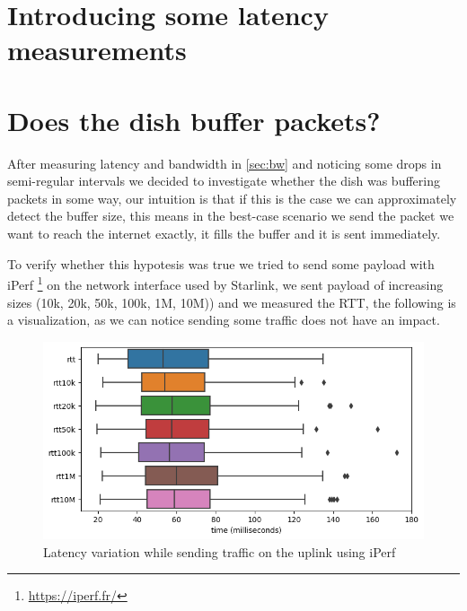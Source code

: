 \documentclass[IN,11pt,twoside,openright,bachelor,english]{tumthesis}
\begin{document}
\section{Introducing some latency measurements}
\section{Does the dish buffer packets?}


After measuring latency and bandwidth in \ref{sec:bw} and noticing some drops in semi-regular intervals we decided to investigate whether the dish was buffering packets in some way, our intuition is that if this is the case we can approximately detect the buffer size, this means in the best-case scenario we send the packet we want to reach the internet exactly, it fills the buffer and it is sent immediately.

To verify whether this hypotesis was true we tried to send some payload with iPerf \footnote{\url{https://iperf.fr/}} on the network interface used by Starlink, we sent payload of increasing sizes (10k, 20k, 50k, 100k, 1M, 10M)) and we measured the RTT, the following is a visualization, as we can notice sending some traffic does not have an impact.


\begin{figure}
	\centering
	\includegraphics[width=0.6\columnwidth]{img/latency_iperf.png}
	\caption{Latency variation while sending traffic on the uplink using iPerf}
\end{figure}

\end{document}
